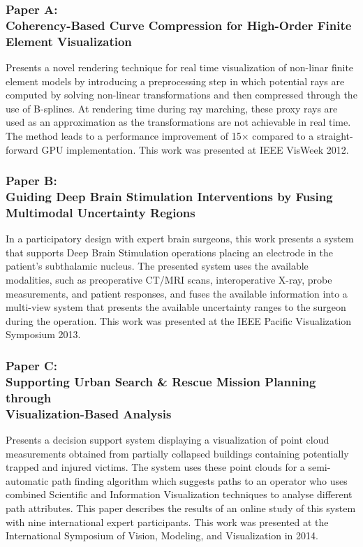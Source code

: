 \subsubsection{Paper A:\\Coherency-Based Curve Compression for High-Order Finite Element Visualization}
Presents a novel rendering technique for real time visualization of non-linar finite element models by introducing a preprocessing step in which potential rays are computed by solving non-linear transformations and then compressed through the use of B-splines. At rendering time during ray marching, these proxy rays are used as an approximation as the transformations are not achievable in real time. The method leads to a performance improvement of 15$\times$ compared to a straight-forward GPU implementation. This work was presented at IEEE VisWeek 2012.

\subsubsection{Paper B:\\Guiding Deep Brain Stimulation Interventions by Fusing Multimodal Uncertainty Regions}
In a participatory design with expert brain surgeons, this work presents a system that supports Deep Brain Stimulation operations placing an electrode in the patient's subthalamic nucleus. The presented system uses the available modalities, such as preoperative CT/MRI scans, interoperative X-ray, probe measurements, and patient responses, and fuses the available information into a multi-view system that presents the available uncertainty ranges to the surgeon during the operation. This work was presented at the IEEE Pacific Visualization Symposium 2013.

\subsubsection{Paper C:\\Supporting Urban Search \& Rescue Mission Planning through \\Visualization-Based Analysis}
Presents a decision support system displaying a  visualization of point cloud measurements obtained from partially collapsed buildings containing potentially trapped and injured victims. The system uses these point clouds for a semi-automatic path finding algorithm which suggests paths to an operator who uses combined Scientific and Information Visualization techniques to analyse different path attributes. This paper describes the results of an online study of this system with nine international expert participants. This work was presented at the International Symposium of Vision, Modeling, and Visualization in 2014.

